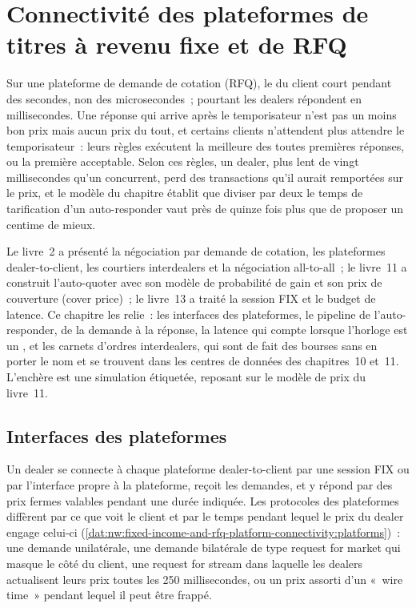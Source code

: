 \chapter{Connectivité des plateformes de titres à revenu fixe et de RFQ}\label{ch:nw:fixed-income-and-rfq-platform-connectivity}

Sur une plateforme de demande de cotation (RFQ), le  du client court pendant des secondes, non des microsecondes~; pourtant les dealers répondent en
millisecondes. Une réponse qui arrive après le temporisateur n'est pas un moins bon prix mais aucun prix du tout, et certains clients n'attendent plus
attendre le temporisateur~: leurs règles exécutent la meilleure des toutes premières réponses, ou la première acceptable. Selon ces règles, un
dealer, plus lent de vingt millisecondes qu'un concurrent, perd des transactions qu'il aurait remportées sur le prix, et le modèle du chapitre établit que
diviser par deux le temps de tarification d'un auto-responder vaut près de quinze fois plus que de proposer un centime de mieux.

Le livre~2 a présenté la négociation par demande de cotation, les plateformes dealer-to-client, les courtiers interdealers et la négociation all-to-all~;
le livre~11 a construit l'auto-quoter avec son modèle de probabilité de gain et son prix de couverture (cover price)~; le livre~13 a traité la session FIX et le budget de latence.
Ce chapitre les relie~: les interfaces des plateformes, le pipeline de l'auto-responder, de la demande à la réponse, la latence qui
compte lorsque l'horloge est un , et les carnets d'ordres interdealers, qui sont de fait des bourses sans en porter le nom et se trouvent dans les
centres de données des chapitres~10 et~11. L'enchère est une simulation étiquetée, reposant sur le modèle de prix du livre~11.

\section{Interfaces des plateformes}

Un dealer se connecte à chaque plateforme dealer-to-client par une session FIX ou par l'interface propre à la plateforme, reçoit les demandes,
et y répond par des prix fermes valables pendant une durée indiquée. Les protocoles des plateformes diffèrent par ce que voit le client et par le temps pendant lequel
le prix du dealer engage celui-ci (\cref{dat:nw:fixed-income-and-rfq-platform-connectivity:platforms})~: une demande unilatérale, une demande bilatérale
de type request for market qui masque le côté du client, une request for stream dans laquelle les dealers actualisent leurs prix toutes les 250
millisecondes, ou un prix assorti d'un «~wire time~» pendant lequel il peut être frappé.

